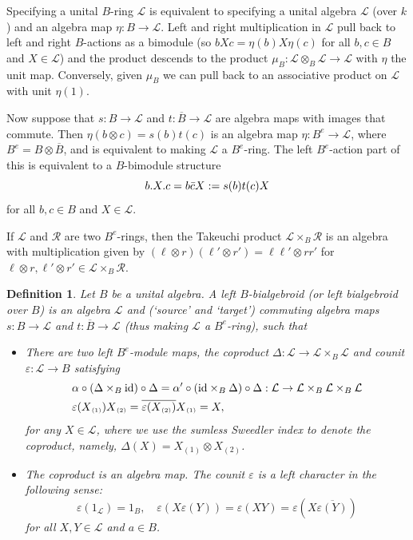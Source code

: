\documentclass[a4paper,reqno]{amsart}
\newcommand*{\id}{\textup{id}}
\numberwithin{equation}{section}
\theoremstyle{plain}
\newtheorem{defi}[thm]{Definition}
\theoremstyle{remark}
\numberwithin{equation}{section}
\newcommand{\ot}{\otimes}
\newcommand{\cL}{\mathcal{L}}
\newcommand{\BB}{\overline{B}}
\renewcommand{\o}{{}_{\scriptscriptstyle{(1)}}}
\renewcommand{\t}{{}_{\scriptscriptstyle{(2)}}}
\DeclareMathOperator{\tens}{\otimes}
\begin{document}
Specifying a unital $B$-ring $\cL$ is equivalent to specifying a unital algebra $\cL$ (over $k$) and an algebra map $\eta:B\to \cL$. Left and right multiplication in $\cL$ pull back to left and right $B$-actions as a bimodule (so $bXc=\eta(b)X\eta(c)$ for all $b,c\in B$ and $X\in \cL$) and the product descends to the product $\mu_B:\cL\tens_B\cL\to \cL$ with $\eta$ the unit map. Conversely, given
$\mu_B$ we can pull back to an associative product on $\cL$ with unit $\eta(1)$.

Now suppose that $s:B\to \cL$ and $t:\BB\to \cL$ are algebra maps with images that commute. Then $\eta(b\tens c)=s(b)t(c)$ is an algebra map $\eta: B^e\to \cL$, where $B^e=B\tens \BB$, and is equivalent to making $\cL$ a $B^e$-ring. The left $B^e$-action part of this is equivalent to a $B$-bimodule structure
\begin{equation}\label{eq:rbgd.bimod}
b.X.c=b\Bar{c}X:= s(b) t(c)X
\end{equation}
for all $b,c\in B$ and $X\in \cL$. 



If $\cL$ and $\mathcal R$ are two $B^e$-rings, then the Takeuchi product $\cL\times_B\mathcal R$ is an algebra with multiplication given by $(\ell\otimes r)(\ell'\otimes r')=\ell\ell' \otimes rr'$ for $\ell\ot r,\ell'\ot r'\in \cL\times_B\mathcal R$.

\begin{defi}\label{def:left.bgd} Let $B$ be a unital algebra. A left $B$-bialgebroid (or left bialgebroid over $B$) is an algebra $\cL$ and (`source' and `target') commuting algebra maps $s:B\to \cL$ and $t:\BB\to \cL$ (thus making $\cL$ a $B^e$-ring), such that
\begin{itemize}
\item[(i)]  There are two left $B^{e}$-module maps, the coproduct $\Delta:\cL\to \cL\times_{B} \cL$ and counit $\varepsilon:\cL\to B$ satisfying
\begin{align*}
&\alpha\circ(\Delta\times_{B}\id)\circ\Delta=\alpha'\circ(\id\times_{B}\Delta)\circ\Delta:\cL\to \cL\times_{B}\cL\times_{B}\cL\\    &\varepsilon(X\o)X\t=\overline{\varepsilon(X\t)}X\o=X,
\end{align*}
for any $X\in\cL$, where we use the sumless Sweedler index to denote the coproduct, namely, $\Delta(X)=X\o\ot X\t$.
\item[(ii)] The coproduct is an algebra map. The counit $\varepsilon$ is a left character in the following sense:
\begin{equation*}\varepsilon(1_{\cL})=1_{B}, \quad \varepsilon(X\varepsilon(Y))=\varepsilon(XY)=\varepsilon(X\overline{\varepsilon(Y)})\end{equation*}
for all $X,Y\in \cL$ and $a\in B$.
\end{itemize}
\end{defi}
\end{document}
